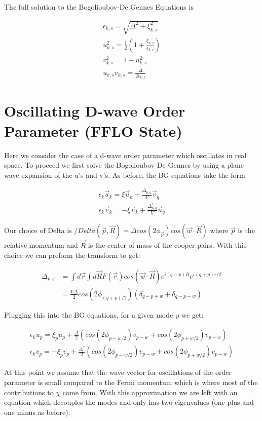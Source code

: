 \documentclass{article}
\begin{document}
The full solution to the Bogolioubov-De Gennes Equations is

\begin{align*}
\epsilon_{k,s}=\sqrt{\Delta^2+\xi_{k,s}^2} \\
u_{k,s}^2=\frac{1}{2}(1+\frac{\xi_{k,s}}{\epsilon_{k,s}}) \\
v_{k,s}^2=1-u_{k,s}^2 \\
u_{k,s}v_{k,s}=\frac{\Delta}{2\epsilon_{k,s}}
\end{align*}

\section*{Oscillating D-wave Order Parameter (FFLO State)}
Here we consider the case of a d-wave order parameter which oscillates in real space. To proceed we first solve the Bogolioubov-De Gennes by using a plane wave expansion of the u's and v's. As before, the BG equations take the form

\begin{align*}
\epsilon_k \vec{u}_k=\mathcal{\xi}\vec{u}_k+\frac{\Delta_{p,q}}{V}\vec{v}_q\\
\epsilon_k \vec{v}_k=-\mathcal{\xi}\vec{v}_k+\frac{\Delta^*_{p,q}}{V}\vec{u}_q
\end{align*}

Our choice of Delta is $/Delta(\vec{p},\vec{R})=\Delta cos(2\phi_{\vec{p}}) cos(\vec{w}\cdot\vec{R})$ where $\vec{p}$ is the relative momentum and $\vec{R}$ is the center of mass of the cooper pairs. With this choice we can preform the transform to get:

\begin{align*}
\Delta_{p,q}&=\int d\vec{r} \int d\vec{R} F(\vec{r})cos(\vec{w}\cdot\vec{R})e^{i(q-p)R}e^{i(q+p)r/2} \\
&=\frac{V\Delta}{2} cos(2\phi_{(q+p)/2})(\delta_{q-p+w}+\delta_{q-p-w})
\end{align*}

Plugging this into the BG equations, for a given mode p we get:

\begin{align*}
\epsilon_k u_p=\xi_p u_p+\frac{\Delta}{2} (cos(2\phi_{p-w/2})v_{p-w}+cos(2\phi_{p+w/2})v_{p+w}) \\
\epsilon_k v_p=-\xi_p v_p+\frac{\Delta^*}{2} (cos(2\phi_{p-w/2})v_{p-w}+cos(2\phi_{p+w/2})v_{p+w})
\end{align*}

At this point we assume that the wave vector for oscillations of the order parameter is small compared to the Fermi momentum which is where most of the contributions to $\chi$ come from. With this approximation we are left with an equation which decouples the modes and only has two eigenvalues (one plus and one minus as before).
\end{document}
